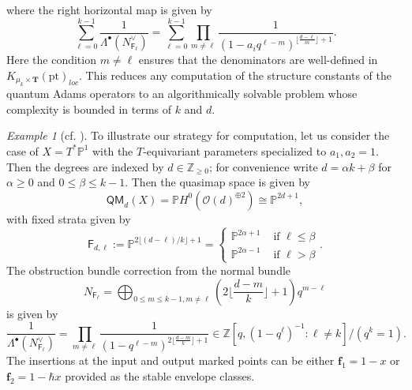 \documentclass[reqno]{amsart}
\numberwithin{equation}{section}
\numberwithin{equation}{section}
\numberwithin{equation}{section}
\theoremstyle{definition}
\theoremstyle{remark}
\theoremstyle{remark}
\newtheorem{example}[thm]{Example}
\begin{document}
where the right horizontal map is given by
\begin{equation}
    \sum_{\ell=0}^{k-1} \frac{1}{\Lambda^\bullet (N_{\mathsf{F}_\ell}^\vee) } = \sum_{\ell=0}^{k-1} \prod_{m \neq \ell} \frac{1}{( 1- a_i q^{\ell-m}) ^{\lfloor \frac{d-\ell}{m } \rfloor +1}}.
\end{equation}
Here the condition $m \neq \ell$ ensures that the denominators are well-defined in $K_{\mu_k \times \mathbf{T}}(\mathrm{pt})_{loc}$. This reduces any computation of the structure constants of the quantum Adams operators to an algorithmically solvable problem whose complexity is bounded in terms of $k$ and $d$.

\begin{example}[{cf. \cite[Section 6.3]{Lee23a}}]
    To illustrate our strategy for computation, let us consider the case of $X = T^*\mathbb{P}^1$ with the $T$-equivariant parameters specialized to  $a_1, a_2 = 1$. Then the degrees are indexed by $d \in \mathbb{Z}_{\ge 0}$; for convenience write $d = \alpha k + \beta$ for $\alpha \ge 0$ and $0 \le \beta \le k-1$. Then the quasimap space is given by
    \begin{equation}
        \mathsf{QM}_d(X) = \mathbb{P} H^0 (\mathcal{O}(d)^{\oplus 2}) \cong \mathbb{P}^{2d+1},
    \end{equation}
    with fixed strata given by
    \begin{equation}
        \mathsf{F}_{d, \ell} := \mathbb{P}^{2 \lfloor (d-\ell)/k \rfloor +1} = \begin{cases} \mathbb{P}^{2\alpha + 1}  & \mbox{ if } \ell \le \beta \\ \mathbb{P}^{2\alpha - 1} & \mbox { if } \ell > \beta \end{cases}.
    \end{equation}
    The obstruction bundle correction from the normal bundle
    \begin{equation}
        N_{\mathsf{F}_\ell} = \bigoplus_{0 \le m \le k-1, m \neq \ell}  \left( 2 \lfloor \frac{d-m}{k} \rfloor +1 \right) q^{m-\ell  }
    \end{equation}
    is given by
    \begin{equation}
        \frac{1}{\Lambda^\bullet ( N_{\mathsf{F}_\ell}^\vee)} = \prod_{m \neq \ell} \frac{1}{(1- q^{\ell-m})^{2 \lfloor \frac{d-m}{k} \rfloor + 1}} \in \mathbb{Z}[q, (1-q^\ell)^{-1} : \ell \neq k ]/(q^k=1).
    \end{equation}
    The insertions at the input and output marked points can be either $\mathbf{f}_1 = 1-x$ or $\mathbf{f}_2  = 1-\hbar x$ provided as the stable envelope classes.


\end{example}
\end{document}
